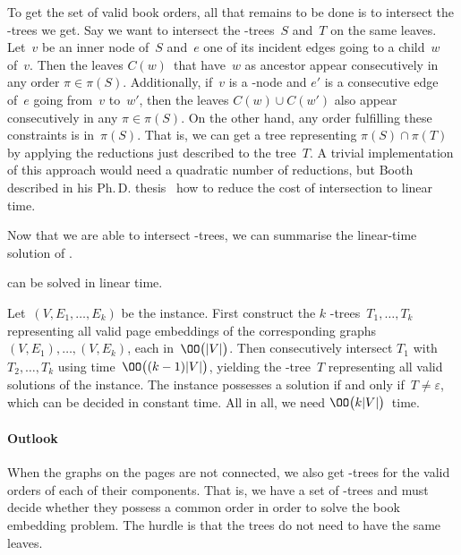 To get the set of valid book orders, all that remains to be done is to intersect the
\PQ-trees we get. Say we want to intersect the \PQ-trees~$S$ and~$T$ on the same leaves. Let~$v$
be an inner node of~$S$ and~$e$ one of its incident edges going to a child~$w$ of~$v$.
Then the leaves $C(w)$~that have~$w$ as ancestor appear consecutively in any order $\pi \in \pi(S)$.
Additionally, if~$v$ is a \Q-node and $e'$ is a consecutive edge of~$e$ going from~$v$ to~$w'$, then the
leaves $C(w) \cup C(w')$ also appear consecutively in any $\pi \in \pi(S)$. On the other hand,
any order fulfilling these constraints is in~$\pi(S)$. That is, we can get a tree
representing $\pi(S) \cap \pi(T)$ by applying the reductions just described to the tree~$T$.
A trivial implementation of this approach would need a quadratic number of reductions, but Booth described in his Ph.\,D. thesis~\cite{Booth75}
how to reduce the cost of intersection to linear time.

Now that we are able to intersect \PQ-trees, we can summarise the linear-time solution
of \probBookConnected.

\begin{theorem}
\probBookConnected can be solved in linear time.
\label{theorem:connected}
\end{theorem}
\begin{myproof}
Let~$(V, E_1,\dotsc, E_k)$ be the \probBookConnected instance.
First construct the $k$ \PQ-trees~$T_1,\dotsc, T_k$ representing all valid page
embeddings of the corresponding graphs~$(V, E_1), \dotsc, (V,E_k)$, each in~$\OO\bigl(|V|\bigr)$. Then consecutively
intersect $T_1$ with $T_2,\dotsc, T_k$ using time~$\OO\bigl((k - 1)|V|\bigr)$, yielding the
\PQ-tree~$T$ representing all valid solutions of the instance. The instance
possesses a solution if and only if~$T \ne \varepsilon$, which can be decided in constant time.
All in all, we need $\OO\bigl(k|V|\bigr)$~time.
\end{myproof}

\paragraph{Outlook}

When the graphs on the pages are not connected, we also get \PQ-trees for the valid orders of each of their components. That is, we have a set of \PQ-trees and must decide whether
they possess a common order in order to solve the book embedding problem. The hurdle is that the trees do not need to have the same leaves. 

